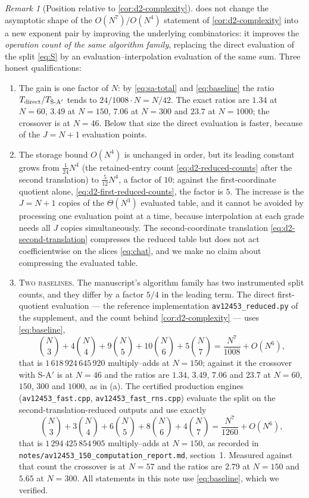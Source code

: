 \documentclass[11pt,reqno]{amsart}
\theoremstyle{definition}
\theoremstyle{remark}
\newtheorem{remark}[theorem]{Remark}
\begin{document}
\begin{remark}[Position relative to \cref{cor:d2-complexity}]
\label{rem:position}
 does not change the asymptotic shape of the
$O(N^7)$/$O(N^4)$ statement of \cref{cor:d2-complexity} into a new exponent
pair by improving the underlying combinatorics: it improves the
\emph{operation count of the same algorithm family}, replacing the direct
evaluation of the split \eqref{eq:S} by an evaluation--interpolation
evaluation of the same sum.  Three honest qualifications:
\begin{enumerate}
\item[(a)] The gain is one factor of $N$: by \eqref{eq:sa-total} and
\eqref{eq:baseline} the ratio $T_{\mathrm{direct}}/T_{\mathrm{S\text-A}'}$
tends to $24/1008\cdot N=N/42$.  The exact ratios are $1.34$ at $N=60$,
$3.49$ at $N=150$, $7.06$ at $N=300$ and $23.7$ at $N=1000$; the crossover
is at $N=46$.  Below that size the direct evaluation is faster, because of
the $J=N+1$ evaluation points.
\item[(b)] The storage bound $O(N^4)$ is unchanged in order, but its leading
constant grows from $\frac1{24}N^4$ (the retained-entry count
\eqref{eq:d2-reduced-counts} after the second translation) to
$\frac5{12}N^4$, a factor of $10$; against the first-coordinate quotient
alone, \eqref{eq:d2-first-reduced-counts}, the factor is $5$.  The
increase is the $J=N+1$ copies of the $\Theta(N^3)$ evaluated table, and it
cannot be avoided by processing one evaluation point at a time, because
interpolation at each grade needs all $J$ copies simultaneously.  The
second-coordinate translation \eqref{eq:d2-second-translation} compresses
the reduced table but does not act coefficientwise on the slices
\eqref{eq:chat}, and we make no claim about compressing the evaluated table.
\item[(c)] \textsc{Two baselines.}  The manuscript's algorithm family has two
instrumented split counts, and they differ by a factor $5/4$ in the leading
term.  The direct first-quotient evaluation --- the reference implementation
\texttt{av12453\_reduced.py} of the supplement, and the count behind
\cref{cor:d2-complexity} --- uses \eqref{eq:baseline},
\[
 \binom N3+4\binom N4+9\binom N5+10\binom N6+5\binom N7
 =\frac{N^7}{1008}+O(N^6),
\]
that is $1\,618\,924\,645\,920$ multiply--adds at $N=150$; against it the
crossover with S-A$'$ is at $N=46$ and the ratios are $1.34$, $3.49$, $7.06$
and $23.7$ at $N=60$, $150$, $300$ and $1000$, as in (a).  The certified
production engines (\texttt{av12453\_fast.cpp},
\texttt{av12453\_fast\_rns.cpp}) evaluate the split on the
second-translation-reduced outputs and use exactly
\[
 \binom N3+3\binom N4+6\binom N5+8\binom N6+4\binom N7
 =\frac{N^7}{1260}+O(N^6),
\]
that is $1\,294\,425\,854\,905$ multiply--adds at $N=150$, as recorded in
\texttt{notes/av12453\_150\_computation\_report.md}, section~1.  Measured
against that count the crossover is at $N=57$ and the ratios are $2.79$ at
$N=150$ and $5.65$ at $N=300$.  All statements in this note use
\eqref{eq:baseline}, which we verified.
\end{enumerate}
\end{remark}
\end{document}
